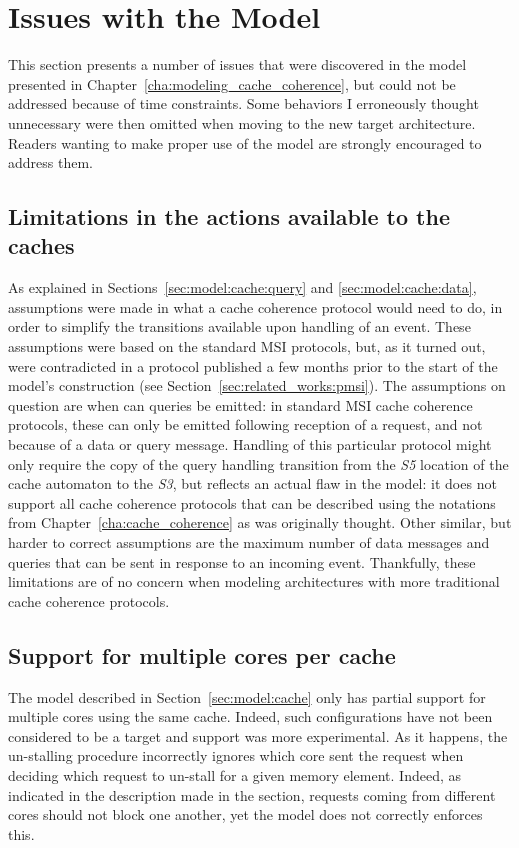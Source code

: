 \section{Issues with the Model}

This section presents a number of issues that were discovered in the model
presented in Chapter~\ref{cha:modeling_cache_coherence}, but could not be
addressed because of time constraints. Some behaviors I erroneously thought
unnecessary were then omitted when moving to the new target architecture.
Readers wanting to make proper use of the model are strongly encouraged to
address them.

\subsection{Limitations in the actions available to the caches}
\label{sec:issue:limited_cache_actions}
As explained in Sections~\ref{sec:model:cache:query} and
\ref{sec:model:cache:data}, assumptions were made in what a cache coherence
protocol would need to do, in order to simplify the transitions available upon
handling of an event. These assumptions were based on the standard MSI
protocols, but, as it turned out, were contradicted in a protocol published a
few months prior to the start of the model's construction (see
Section~\ref{sec:related_works:pmsi}). The assumptions on question are when can
queries be emitted: in standard MSI cache coherence protocols, these can only
be emitted following reception of a request, and not because of a data or query
message. Handling of this particular protocol might only require the copy of
the query handling transition from the \textit{S5} location of the cache
automaton to the \textit{S3}, but reflects an actual flaw in the model: it does
not support all cache coherence protocols that can be described using the
notations from Chapter~\ref{cha:cache_coherence} as was originally thought. Other
similar, but harder to correct assumptions are the maximum number of data
messages and queries that can be sent in response to an incoming event.
Thankfully, these limitations are of no concern when modeling architectures
with more traditional cache coherence protocols.

\subsection{Support for multiple cores per cache}
\label{sec:discussion:cache:multi-core-per-cache}
The model described in Section~\ref{sec:model:cache} only has partial support
for multiple cores using the same cache. Indeed, such configurations have not
been considered to be a target and support was more experimental. As it happens,
the un-stalling procedure incorrectly ignores which core sent the request when
deciding which request to un-stall for a given memory element. Indeed, as
indicated in the description made in the section, requests coming from different
cores should not block one another, yet the model does not correctly enforces
this.

